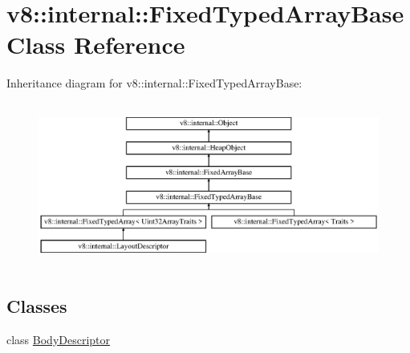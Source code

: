 \hypertarget{classv8_1_1internal_1_1_fixed_typed_array_base}{}\section{v8\+:\+:internal\+:\+:Fixed\+Typed\+Array\+Base Class Reference}
\label{classv8_1_1internal_1_1_fixed_typed_array_base}
Inheritance diagram for v8\+:\+:internal\+:\+:Fixed\+Typed\+Array\+Base\+:\begin{figure}[H]
\begin{center}
\leavevmode
\includegraphics[height=5.419354cm]{classv8_1_1internal_1_1_fixed_typed_array_base}
\end{center}
\end{figure}
\subsection*{Classes}
\begin{DoxyCompactItemize}
\item 
class \hyperlink{classv8_1_1internal_1_1_fixed_typed_array_base_1_1_body_descriptor}{Body\+Descriptor}
\end{DoxyCompactItemize}
